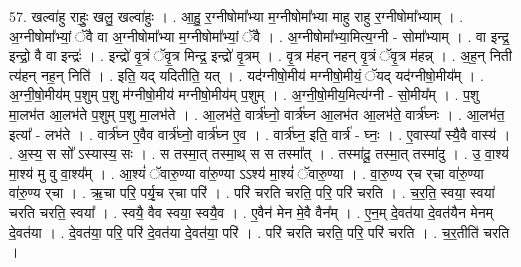 \documentclass[17pt]{extarticle}
\begin{document}
57. खल्वा॑हु राहुः॒ खलु॒ खल्वा॑हुः । . आ॒हु॒ र॒ग्नीषोमा᳚भ्या म॒ग्नीषोमा᳚भ्या माहु राहु र॒ग्नीषोमा᳚भ्याम् । . अ॒ग्नीषोमा᳚भ्यां॒ ॅवै वा अ॒ग्नीषोमा᳚भ्या म॒ग्नीषोमा᳚भ्यां॒ ॅवै । . अ॒ग्नीषोमा᳚भ्या॒मित्य॒ग्नी - सोमा᳚भ्याम् । . वा इन्द्र॒ इन्द्रो॒ वै वा इन्द्रः॑ । . इन्द्रो॑ वृ॒त्रं ॅवृ॒त्र मिन्द्र॒ इन्द्रो॑ वृ॒त्रम् । . वृ॒त्र म॑हन् नहन् वृ॒त्रं ॅवृ॒त्र म॑हन्न् । . अ॒ह॒न् निती त्य॑हन् नह॒न् निति॑ । . इति॒ यद् यदितीति॒ यत् । . यद॑ग्नीषो॒मीय॑ मग्नीषो॒मीयं॒ ॅयद् यद॑ग्नीषो॒मीय᳚म् । . अ॒ग्नी॒षो॒मीय॑म् प॒शुम् प॒शु म॑ग्नीषो॒मीय॑ मग्नीषो॒मीय॑म् प॒शुम् । . अ॒ग्नी॒षो॒मीय॒मित्य॑ग्नी - सो॒मीय᳚म् । . प॒शु मा॒लभ॑त आ॒लभ॑ते प॒शुम् प॒शु मा॒लभ॑ते । . आ॒लभ॑ते॒ वार्त्र॑घ्नो॒ वार्त्र॑घ्न आ॒लभ॑त आ॒लभ॑ते॒ वार्त्र॑घ्नः । . आ॒लभ॑त॒ इत्या᳚ - लभ॑ते । . वार्त्र॑घ्न ए॒वैव वार्त्र॑घ्नो॒ वार्त्र॑घ्न ए॒व । . वार्त्र॑घ्न॒ इति॒ वार्त्र॑ - घ्नः॒ । . ए॒वास्या᳚ स्यै॒वै वास्य॑ । . अ॒स्य॒ स सो᳚ ऽस्यास्य॒ सः । . स तस्मा॒त् तस्मा॒थ् स स तस्मा᳚त् । . तस्मा॑दू॒ तस्मा॒त् तस्मा॑दु । . उ॒ वा॒श्य॑ मा॒श्य॑ मु वु वा॒श्य᳚म् । . आ॒श्यं॑ ॅवारु॒ण्या वा॑रु॒ण्या ऽऽश्य॑ मा॒श्यं॑ ॅवारु॒ण्या । . वा॒रु॒ण्य र्‌च र्‌चा वा॑रु॒ण्या वा॑रु॒ण्य र्‌चा । . ऋ॒चा परि॒ पर्यृ॒च र्‌चा परि॑ । . परि॑ चरति चरति॒ परि॒ परि॑ चरति । . च॒र॒ति॒ स्वया॒ स्वया॑ चरति चरति॒ स्वया᳚ । . स्वयै॒ वैव स्वया॒ स्वयै॒व । . ए॒वैन॑ मेन मे॒वै वैन᳚म् । . ए॒न॒म् दे॒वत॑या दे॒वत॑यैन मेनम् दे॒वत॑या । . दे॒वत॑या॒ परि॒ परि॑ दे॒वत॑या दे॒वत॑या॒ परि॑ । . परि॑ चरति चरति॒ परि॒ परि॑ चरति । . च॒र॒तीति॑ चरति । \newline
\end{document}
